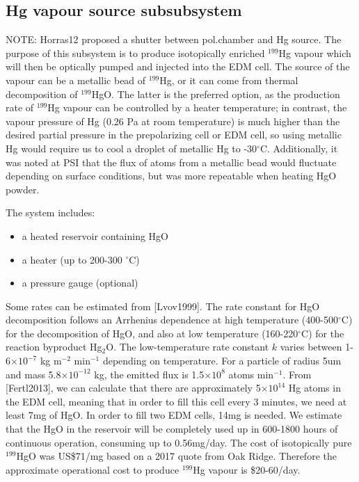 \documentclass[11pt]{article}
\begin{document}
\subsection{Hg vapour source subsubsystem}
NOTE: Horras12 proposed a shutter between pol.chamber and Hg source.
The purpose of this subsystem is to produce isotopically enriched $^{199}$Hg vapour which will then be optically pumped and injected into the EDM cell.  The source of the vapour can be a metallic bead of $^{199}$Hg, or it can come from thermal decomposition of  $^{199}$HgO.  The latter is the preferred option, as the production rate of $^{199}$Hg vapour can be controlled by a heater temperature; in contrast, the vapour pressure of Hg (0.26 Pa at room temperature) is much higher than the desired partial pressure in the prepolarizing cell or EDM cell, so using metallic Hg would require us to cool a droplet of metallic Hg to -30$^\circ$C.  Additionally, it was noted at PSI that the flux of atoms from a metallic bead would fluctuate depending on surface conditions, but was more repeatable when heating HgO powder.

The system includes:
\begin{itemize}
\item a heated reservoir containing HgO
\item a heater (up to 200-300 $^\circ$C)
\item a pressure gauge (optional)
\end{itemize}

Some rates can be estimated from [Lvov1999].  The rate constant for HgO decomposition follows an Arrhenius dependence at high temperature (400-500$^\circ$C) for the decomposition of HgO, and also at low temperature (160-220$^\circ$C) for the reaction byproduct Hg$_2$O.  The low-temperature rate constant $k$ varies between 1-6$\times10^{-7}$ kg m$^{-2}$ min$^{-1}$ depending on temperature.  For a particle of radius 5um and mass 5.8$\times10^{-12}$ kg, the emitted flux is 1.5$\times10^{8}$ atoms min$^{-1}$. From [Fertl2013], we can calculate that there are approximately 5$\times10^{14}$ Hg atoms in the EDM cell, meaning that in order to fill this cell every 3 minutes, we need at least 7mg of HgO.  In order to fill two EDM cells, 14mg is needed.  We estimate that the HgO in the reservoir will be completely used up in 600-1800 hours of continuous operation, consuming up to 0.56mg/day. The cost of isotopically pure $^{199}$HgO was US\$71/mg based on a 2017 quote from Oak Ridge.  Therefore the approximate operational cost to produce $^{199}$Hg vapour is \$20-60/day.
\end{document}
